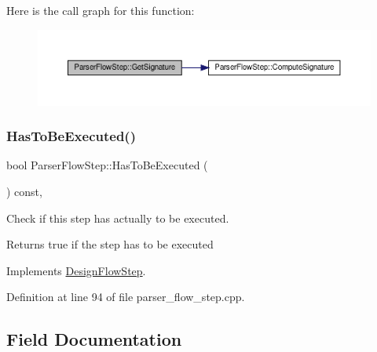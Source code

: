 Here is the call graph for this function\+:
\nopagebreak
\begin{figure}[H]
\begin{center}
\leavevmode
\includegraphics[width=350pt]{dd/d99/classParserFlowStep_aa20842b21ed80673edb2fc8a664cc9b6_cgraph}
\end{center}
\end{figure}
\mbox{\label{classParserFlowStep_afaf2f3989d660b1cfaa00c8d51deb570}} 
\subsubsection{\texorpdfstring{Has\+To\+Be\+Executed()}{HasToBeExecuted()}}
{\footnotesize\ttfamily bool Parser\+Flow\+Step\+::\+Has\+To\+Be\+Executed (\begin{DoxyParamCaption}{ }\end{DoxyParamCaption}) const\hspace{0.3cm}{\ttfamily [override]}, {\ttfamily [virtual]}}



Check if this step has actually to be executed. 

\begin{DoxyReturn}{Returns}
true if the step has to be executed 
\end{DoxyReturn}


Implements \hyperlink{classDesignFlowStep_a1783abe0c1d162a52da1e413d5d1ef05}{Design\+Flow\+Step}.



Definition at line 94 of file parser\+\_\+flow\+\_\+step.\+cpp.



\subsection{Field Documentation}
\mbox{\label{classParserFlowStep_a728b0a03e63e3529176b848880d12c72}} 
